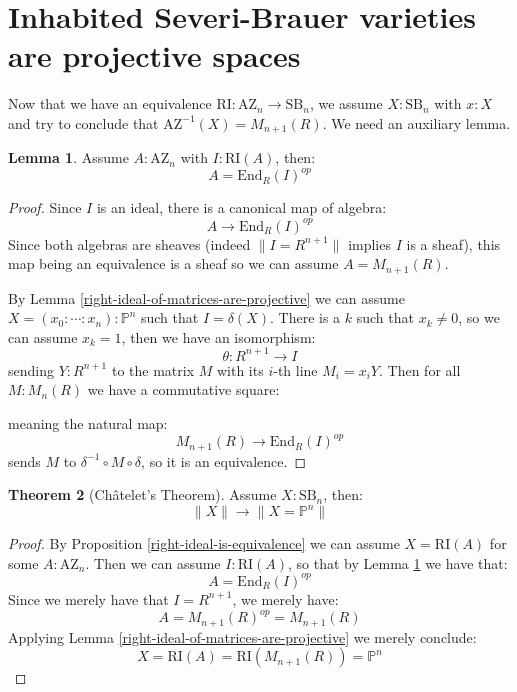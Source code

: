 \documentclass[10pt,a4paper]{article}
\theoremstyle{definition}
\newtheorem{theorem}{Theorem}[section]
\newtheorem{lemma}[theorem]{Lemma}
\newcommand{\SB}{\mathrm{SB}}
\newcommand{\RI}{\mathrm{RI}}
\newcommand{\AZ}{\mathrm{AZ}}
\newcommand{\propTrunc}[1]{\lVert #1 \rVert}
\newcommand{\bP}{\mathbb{P}}
\begin{document}
\section{Inhabited Severi-Brauer varieties are projective spaces}

Now that we have an equivalence $\RI:\AZ_n \to \SB_n$, we assume $X:\SB_n$ with $x:X$ and try to conclude that $\AZ^{-1}(X) = M_{n+1}(R)$. We need an auxiliary lemma.

\begin{lemma}\label{azumaya-with-right-ideal}
Assume $A:\AZ_n$ with $I:\RI(A)$, then:
\[A = \mathrm{End}_R(I)^{op}\]
\end{lemma}

\begin{proof}
Since $I$ is an ideal, there is a canonical map of algebra:
\[A \to\mathrm{End}_R(I)^{op}\]
Since both algebras are sheaves (indeed $\propTrunc{I=R^{n+1}}$ implies $I$ is a sheaf), this map being an equivalence is a sheaf so we can assume $A=M_{n+1}(R)$.

By Lemma \ref{right-ideal-of-matrices-are-projective} we can assume $X=(x_0:\cdots:x_n):\bP^n$ such that $I=\delta(X)$. There is a $k$ such that $x_k\not=0$, so we can assume $x_k=1$, then we have an isomorphism:
\[\theta:R^{n+1}\to I\]
sending $Y:R^{n+1}$ to the matrix $M$ with its $i$-th line $M_i=x_iY$. Then for all $M:M_n(R)$ we have a commutative square:
\begin{center}
\end{center}
meaning the natural map:
\[ M_{n+1}(R)\to \mathrm{End}_R(I)^{op}\]
sends $M$ to $\delta^{-1}\circ M\circ\delta$, so it is an equivalence.
\end{proof}

\begin{theorem}[Ch\^atelet's Theorem]\label{chatelet-theorem}
Assume $X:\SB_n$, then:
\[\propTrunc{X}\to\propTrunc{X=\bP^n}\]
\end{theorem}

\begin{proof}
By Proposition \ref{right-ideal-is-equivalence} we can assume $X=\RI(A)$ for some $A:\AZ_n$. Then we can assume $I:\RI(A)$, so that by Lemma \ref{azumaya-with-right-ideal} we have that:
\[A=\mathrm{End}_R(I)^{op}\]
Since we merely have that $I=R^{n+1}$, we merely have:
\[A = M_{n+1}(R)^{op} = M_{n+1}(R)\]
Applying Lemma \ref{right-ideal-of-matrices-are-projective} we merely conclude:
\[X=\RI(A)=\RI(M_{n+1}(R)) = \bP^n\]
\end{proof}
\end{document}
